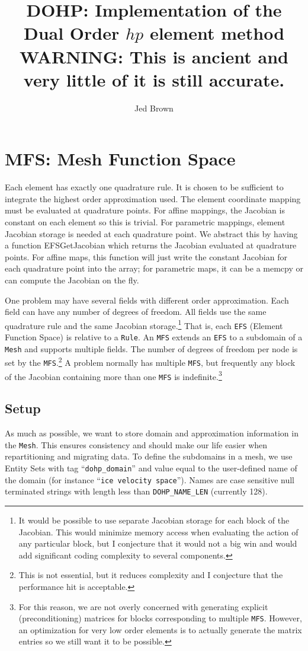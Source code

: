 \documentclass[a4paper]{article}
\title{DOHP: Implementation of the Dual Order $hp$ element method\\ \bf{WARNING: This is ancient and very little of it is still accurate.}}
\author{Jed Brown}
\newcommand{\struct}[1]{\texttt{#1}}
\newcommand{\trl}[1]{\texttt{#1}}
\begin{document}
\maketitle

\section{MFS: Mesh Function Space}
Each element has exactly one quadrature rule.  It is chosen to be sufficient to integrate the highest order
approximation used.  The element coordinate mapping must be evaluated at quadrature points.  For affine mappings, the
Jacobian is constant on each element so this is trivial.  For parametric mappings, element Jacobian storage is needed at
each quadrature point.  We abstract this by having a function EFSGetJacobian which returns the Jacobian evaluated at
quadrature points.  For affine maps, this function will just write the constant Jacobian for each quadrature point into
the array; for parametric maps, it can be a memcpy or can compute the Jacobian on the fly.

One problem may have several fields with different order approximation.  Each field can have any number of degrees of
freedom.  All fields use the same quadrature rule and the same Jacobian storage.\footnote{It would be possible to use
  separate Jacobian storage for each block of the Jacobian.  This would minimize memory access when evaluating the
  action of any particular block, but I conjecture that it would not a big win and would add significant coding
  complexity to several components.}  That is, each \trl{EFS} (Element Function Space) is relative to a \struct{Rule}.
An \trl{MFS} extends an \trl{EFS} to a subdomain of a \trl{Mesh} and supports multiple fields.  The number of degrees of
freedom per node is set by the \trl{MFS}.\footnote{This is not essential, but it reduces complexity and I conjecture
  that the performance hit is acceptable.}  A problem normally has multiple \trl{MFS}, but frequently any block of the
Jacobian containing more than one \trl{MFS} is indefinite.\footnote{For this reason, we are not overly concerned with
  generating explicit (preconditioning) matrices for blocks corresponding to multiple \trl{MFS}.  However, an
  optimization for very low order elements is to actually generate the matrix entries so we still want it to be
  possible.}

\subsection{Setup}
As much as possible, we want to store domain and approximation information in the \trl{Mesh}.  This ensures consistency
and should make our life easier when repartitioning and migrating data.  To define the subdomains in a mesh, we use
Entity Sets with tag ``\trl{dohp\_domain}'' and value equal to the user-defined name of the domain (for instance
``\trl{ice velocity space}'').  Names are case sensitive null terminated strings with length less than
\trl{DOHP\_NAME\_LEN} (currently 128).
\end{document}
